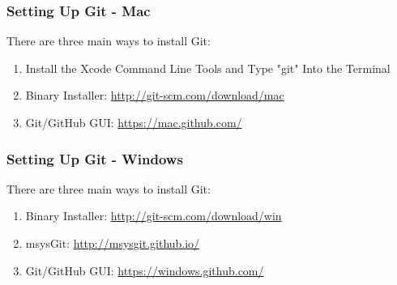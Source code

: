 \begin{frame}
\frametitle{\large{Setting Up Git - Mac}}
There are three main ways to install Git:
\begin{enumerate}
\item Install the Xcode Command Line Tools and Type "git" Into the Terminal
\item Binary Installer: \href{http://git-scm.com/download/mac}{http://git-scm.com/download/mac}
\item Git/GitHub GUI: \href{https://mac.github.com/}{https://mac.github.com/}
\end{enumerate}
\end{frame}

\begin{frame}
\frametitle{\large{Setting Up Git - Windows}}
There are three main ways to install Git:
\begin{enumerate}
\item Binary Installer: \href{http://git-scm.com/download/win}{http://git-scm.com/download/win}
\item msysGit: \href{http://msysgit.github.io/}{http://msysgit.github.io/}
\item Git/GitHub GUI: \href{https://windows.github.com/}{https://windows.github.com/}
\end{enumerate}
\end{frame}


\frame{
\frametitle{\large{}}
	\huge{\center{\color{RUBblau}{Thank you for your attention.}}}
}



